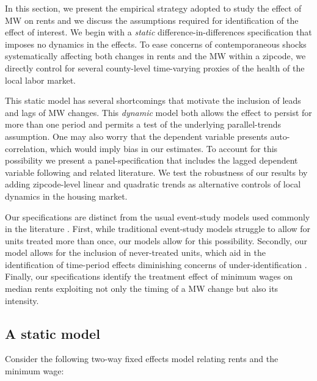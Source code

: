 
In this section, we present the empirical strategy adopted to study the effect of MW 
on rents and we discuss the assumptions required for identification of the effect of 
interest. We begin with a \textit{static} difference-in-differences specification 
that imposes no dynamics in the effects. To ease concerns of contemporaneous shocks 
systematically affecting both changes in rents and the MW within a zipcode, we 
directly control for several county-level time-varying proxies of the health of the 
local labor market.

This static model has several shortcomings that motivate the inclusion of leads and 
lags of MW changes. This \textit{dynamic} model both allows the effect to persist for 
more than one period and permits a test of the underlying parallel-trends assumption. 
One may also worry that the dependent variable presents auto-correlation, which would 
imply bias in our estimates. To account for this possibility we present a 
panel-specification that includes the lagged dependent variable following 
\textcite{ArellanoBond1991} and related literature. We test the robustness of our 
results by adding zipcode-level linear and quadratic trends as alternative
controls of local dynamics in the housing market. 

Our specifications are distinct from the usual event-study models used commonly 
in the literature \parencite[discussed in, e.g.,][]{BorusyakJaravel2017, 
abraham2018}. First, while traditional event-study models struggle to allow for 
units treated more than once, our models allow for this possibility. Secondly, 
our model allows for the inclusion of never-treated units, which aid in the 
identification of time-period effects diminishing concerns of under-identification 
\parencite{BorusyakJaravel2017}. Finally, our specifications identify the treatment 
effect of minimum wages on median rents exploiting not only the timing of a MW change 
but also its intensity.
    
\subsection{A static model}
Consider the following two-way fixed effects model relating rents and the minimum wage:

